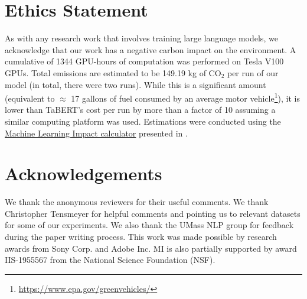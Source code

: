 \documentclass[11pt]{article}
\begin{document}
\section{Ethics Statement}
\label{sec:ethics}
As with any research work that involves training large language models, we acknowledge that our work has a negative carbon impact on the environment. A cumulative of 1344 GPU-hours of computation was performed on Tesla V100 GPUs. Total emissions are estimated to be 149.19 kg of CO$_2$ per run of our model (in total, there were two runs). While this is a significant amount (equivalent to $\approx$ 17 gallons of fuel consumed by an average motor vehicle\footnote{\url{https://www.epa.gov/greenvehicles/}}), it is lower than TaBERT’s cost per run by more than a factor of 10 assuming a similar computing platform was used.  
Estimations were conducted using the \href{https://mlco2.github.io/impact#compute}{Machine Learning Impact calculator} presented in \citet{lacoste2019quantifying}. \section*{Acknowledgements}
\label{sec:acknowledge}

We thank the anonymous reviewers for their useful comments. We thank Christopher Tensmeyer for helpful comments and pointing us to relevant datasets for some of our experiments. We also thank the UMass NLP group for feedback during the paper writing process. This work was made possible by research awards from Sony Corp. and Adobe Inc. MI is also partially supported by  award IIS-1955567 from the National Science
Foundation (NSF).

 



\end{document}

